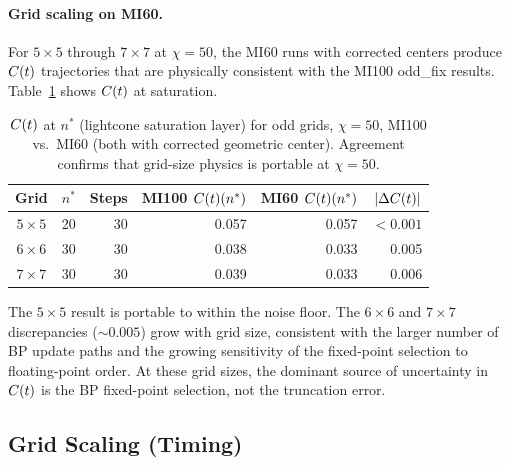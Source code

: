 \paragraph{Grid scaling on MI60.}
For $5\times5$ through $7\times7$ at $\chi=50$, the MI60 runs with corrected
centers produce $C(t)$ trajectories that are physically consistent with the
MI100 odd\_fix results.
Table~\ref{tab:mi60_grids} shows $C(t)$ at saturation.

\begin{table}[ht]
\centering
\caption{$C(t)$ at $n^*$ (lightcone saturation layer) for odd grids,
  $\chi=50$, MI100 vs.\ MI60 (both with corrected geometric center).
  Agreement confirms that grid-size physics is portable at $\chi=50$.}
\label{tab:mi60_grids}
\begin{tabular}{ccrrrr}
\toprule
Grid & $n^*$ & Steps & MI100 $C(t)(n^*)$ & MI60 $C(t)(n^*)$ & $|\Delta C(t)|$ \\
\midrule
$5\times5$ & 20 & 30 & 0.057 & 0.057 & $<0.001$ \\
$6\times6$ & 30 & 30 & 0.038 & 0.033 & 0.005    \\
$7\times7$ & 30 & 30 & 0.039 & 0.033 & 0.006    \\
\bottomrule
\end{tabular}
\end{table}

The $5\times5$ result is portable to within the noise floor.
The $6\times6$ and $7\times7$ discrepancies ($\sim 0.005$) grow with
grid size, consistent with the larger number of BP update paths and the
growing sensitivity of the fixed-point selection to floating-point order.
At these grid sizes, the dominant source of uncertainty in $C(t)$ is the
BP fixed-point selection, not the truncation error.

\FloatBarrier   %
\subsection{Grid Scaling (Timing)}
\label{sec:grid_timing}

